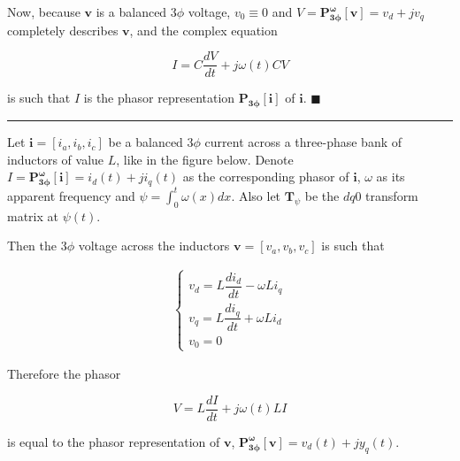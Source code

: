 	Now, because $\mathbf{v}$ is a balanced 3$\phi$ voltage, $v_0 \equiv 0$ and $V = \mathbf{P^{\omega}_{3\phi}}\left[\mathbf{v}\right] = v_d + jv_q$ completely describes $\mathbf{v}$, and the complex equation

\begin{equation} I = C\dfrac{dV}{dt} + j\omega(t)C V \end{equation}

	\noindent is such that $I$ is the phasor representation $\mathbf{P_{3\phi}}\left[\mathbf{i}\right]$ of $\mathbf{i}$.  \hfill$\blacksquare$

\vspace{5mm}
\hrule
\vspace{5mm}

\begin{theorem}\label{theo:3p_inductive_impedance} %
Let $\mathbf{i} = \left[i_a,i_b,i_c\right]$ be a balanced 3$\phi$ current across a three-phase bank of inductors of value $L$, like in the figure below. Denote $I = \mathbf{P^{\omega}_{3\phi}}\left[\mathbf{i}\right] = i_d\left(t\right) + ji_q\left(t\right)$ as the corresponding phasor of $\mathbf{i}$, $\omega$ as its apparent frequency and $\psi = \int_{0}^{t} \omega(x)dx$. Also let $\mathbf{T}_\psi$ be the $dq0$ transform matrix at $\psi(t)$.

\begin{center}
\end{center} %

	Then the 3$\phi$ voltage across the inductors $\mathbf{v} = \left[v_a,v_b,v_c\right]$ is such that

\begin{align}
\left\{\begin{array}{l}
        v_d = L\dfrac{di_d}{dt} - \omega L i_q \\[5mm]
        v_q = L\dfrac{di_q}{dt} + \omega L i_d \\[5mm]
        v_0 = 0
\end{array}\right.
\end{align}

	Therefore the phasor

\begin{equation} V = L\dfrac{dI}{dt} + j\omega(t)L I \end{equation}

	is equal to the phasor representation of $\mathbf{v}$, $\mathbf{P^{\omega}_{3\phi}}\left[\mathbf{v}\right] = v_d(t) + jy_q(t)$.
\end{theorem}
